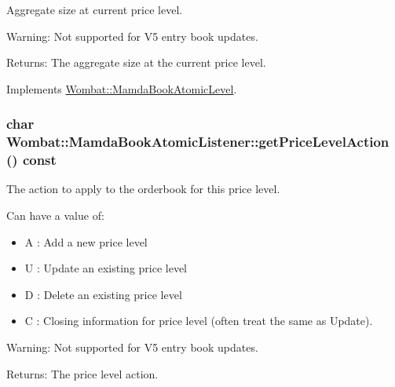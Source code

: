 Aggregate size at current price level. 

\begin{Desc}
\item[Warning:]Not supported for V5 entry book updates.\end{Desc}
\begin{Desc}
\item[Returns:]The aggregate size at the current price level. \end{Desc}


Implements \hyperlink{classWombat_1_1MamdaBookAtomicLevel_55c19ae02d863ce2007f4332af271f9b}{Wombat::Mamda\-Book\-Atomic\-Level}.\hypertarget{classWombat_1_1MamdaBookAtomicListener_9bbc72a64bd32fba449ba581b369a980}{
\subsubsection[getPriceLevelAction]{\setlength{\rightskip}{0pt plus 5cm}char Wombat::Mamda\-Book\-Atomic\-Listener::get\-Price\-Level\-Action () const}}
\label{classWombat_1_1MamdaBookAtomicListener_9bbc72a64bd32fba449ba581b369a980}


The action to apply to the orderbook for this price level. 

Can have a value of: \begin{itemize}
\item A : Add a new price level \item U : Update an existing price level \item D : Delete an existing price level \item C : Closing information for price level (often treat the same as Update). \end{itemize}


\begin{Desc}
\item[Warning:]Not supported for V5 entry book updates.\end{Desc}
\begin{Desc}
\item[Returns:]The price level action. \end{Desc}


